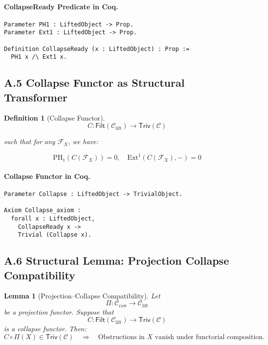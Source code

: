 \documentclass[11pt]{article}
\newtheorem{definition}[theorem]{Definition}
\newtheorem{lemma}[theorem]{Lemma}
\begin{document}
\paragraph{CollapseReady Predicate in Coq.}

\begin{lstlisting}[language=Coq]
Parameter PH1 : LiftedObject -> Prop.
Parameter Ext1 : LiftedObject -> Prop.

Definition CollapseReady (x : LiftedObject) : Prop :=
  PH1 x /\ Ext1 x.
\end{lstlisting}

\subsection*{A.5 Collapse Functor as Structural Transformer}

\begin{definition}[Collapse Functor]
\[
C : \mathsf{Filt}(\mathcal{C}_{\mathrm{lift}}) \longrightarrow \mathsf{Triv}(\mathcal{C})
\]

such that for any \( \mathcal{F}_X \), we have:

\[
\mathrm{PH}_1(C(\mathcal{F}_X)) = 0, \quad \mathrm{Ext}^1(C(\mathcal{F}_X), -) = 0
\]
\end{definition}

\paragraph{Collapse Functor in Coq.}

\begin{lstlisting}[language=Coq]
Parameter Collapse : LiftedObject -> TrivialObject.

Axiom Collapse_axiom :
  forall x : LiftedObject,
    CollapseReady x ->
    Trivial (Collapse x).
\end{lstlisting}

\subsection*{A.6 Structural Lemma: Projection Collapse Compatibility}

\begin{lemma}[Projection--Collapse Compatibility]
Let 
\[
\Pi: \mathcal{C}_{\mathrm{raw}} \to \mathcal{C}_{\mathrm{lift}}
\]
be a projection functor. Suppose that 
\[
C: \mathsf{Filt}(\mathcal{C}_{\mathrm{lift}}) \to \mathsf{Triv}(\mathcal{C})
\]
is a collapse functor. Then:
\[
C \circ \Pi(X) \in \mathsf{Triv}(\mathcal{C}) \quad \Rightarrow \quad
\text{Obstructions in } X \text{ vanish under functorial composition}.
\]
\end{lemma}
\end{document}
